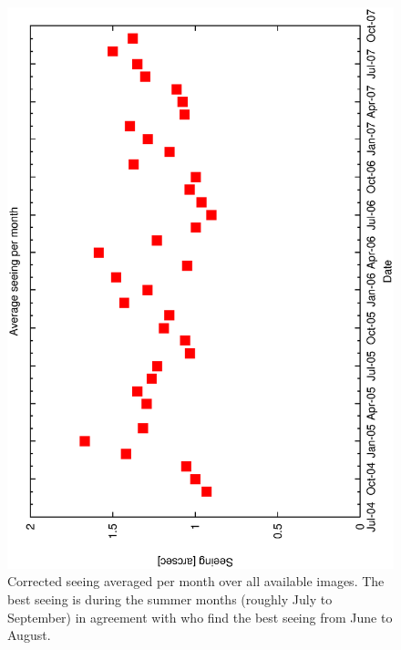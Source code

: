 {{\begin{figure}[htbp]
\begin{center}
    \includegraphics[scale=0.4, angle=-90]{figures/ecs/corr_see_monthly.eps}
\end{center} 
\caption[Corrected r-band seeing averaged per month over available images.]
{Corrected seeing averaged per month over all available images. The best seeing is during the summer months (roughly July to September) in agreement with \citet{munoz97nighttime} who find the best seeing from June to August.}
\label{fig:monthly_seeing}
\end{figure}



}}
